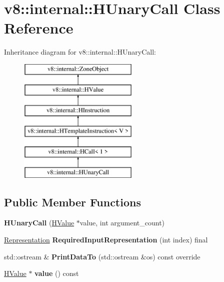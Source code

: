 \hypertarget{classv8_1_1internal_1_1_h_unary_call}{}\section{v8\+:\+:internal\+:\+:H\+Unary\+Call Class Reference}
\label{classv8_1_1internal_1_1_h_unary_call}
Inheritance diagram for v8\+:\+:internal\+:\+:H\+Unary\+Call\+:\begin{figure}[H]
\begin{center}
\leavevmode
\includegraphics[height=6.000000cm]{classv8_1_1internal_1_1_h_unary_call}
\end{center}
\end{figure}
\subsection*{Public Member Functions}
\begin{DoxyCompactItemize}
\item 
{\bfseries H\+Unary\+Call} (\hyperlink{classv8_1_1internal_1_1_h_value}{H\+Value} $\ast$value, int argument\+\_\+count)\hypertarget{classv8_1_1internal_1_1_h_unary_call_a1ec7a4ef2ac15e9b37e5298e7ac0986b}{}\label{classv8_1_1internal_1_1_h_unary_call_a1ec7a4ef2ac15e9b37e5298e7ac0986b}

\item 
\hyperlink{classv8_1_1internal_1_1_representation}{Representation} {\bfseries Required\+Input\+Representation} (int index) final\hypertarget{classv8_1_1internal_1_1_h_unary_call_aa0e1773146a4d01aabffe5f8b0e071b6}{}\label{classv8_1_1internal_1_1_h_unary_call_aa0e1773146a4d01aabffe5f8b0e071b6}

\item 
std\+::ostream \& {\bfseries Print\+Data\+To} (std\+::ostream \&os) const  override\hypertarget{classv8_1_1internal_1_1_h_unary_call_ac07456da9bbe27f146cfcb2dc380e20c}{}\label{classv8_1_1internal_1_1_h_unary_call_ac07456da9bbe27f146cfcb2dc380e20c}

\item 
\hyperlink{classv8_1_1internal_1_1_h_value}{H\+Value} $\ast$ {\bfseries value} () const \hypertarget{classv8_1_1internal_1_1_h_unary_call_a3eb810291644e6c1f953ee144f7f7d9b}{}\label{classv8_1_1internal_1_1_h_unary_call_a3eb810291644e6c1f953ee144f7f7d9b}

\end{DoxyCompactItemize}

